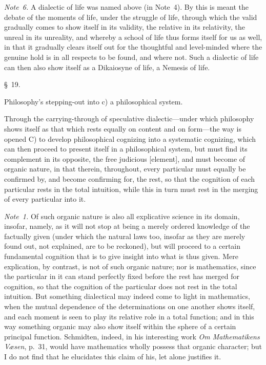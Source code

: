 \documentclass[12pt,a4paper]{book}
\begin{document}
{\small\emph{Note~6.} A dialectic of life was named above (in Note~4). By this is meant
the debate of the moments of life, under the struggle of life, through which the valid
gradually comes to show itself in its validity, the relative in its relativity, the
unreal in its unreality, and whereby a school of life thus forms itself for us as well,
in that it gradually clears itself out for the thoughtful and level-minded where the
genuine hold is in all respects to be found, and where not. Such a dialectic of life
can then also show itself as a Dikaiosyne of life, a Nemesis of life.\par}

\begin{center}\large\S~19.\end{center}
\begin{center}Philosophy's stepping-out into c) a philosophical system.\end{center}

Through the carrying-through of speculative dialectic---under which philosophy shows
itself as that which rests equally on content and on form---the way is opened C) to
develop philosophical cognizing into a systematic cognizing, which can then proceed
to present itself in a philosophical system, but must find its complement in its
opposite, the free judicious [element], and must become of organic nature, in that
therein, throughout, every particular must equally be confirmed by, and become
confirming for, the rest, so that the cognition of each particular rests in the
total intuition, while this in turn must rest in the merging of every particular
into it.

{\small\emph{Note~1.} Of such organic nature is also all explicative science in its
domain, insofar, namely, as it will not stop at being a merely ordered knowledge of
the factually given (under which the natural laws too, insofar as they are merely
found out, not explained, are to be reckoned), but will proceed to a certain
fundamental cognition that is to give insight into what is thus given. Mere
explication, by contrast, is not of such organic nature; nor is mathematics, since
the particular in it can stand perfectly fixed before the rest has merged for
cognition, so that the cognition of the particular does not rest in the total
intuition. But something dialectical may indeed come to light in mathematics, when
the mutual dependence of the determinations on one another shows itself, and each
moment is seen to play its relative role in a total function; and in this way
something organic may also show itself within the sphere of a certain principal
function. Schmidten, indeed, in his interesting work \textit{Om Mathematikens
Væsen}, p.~31, would have mathematics wholly possess that organic character; but I
do not find that he elucidates this claim of his, let alone justifies it.\par}
\end{document}
